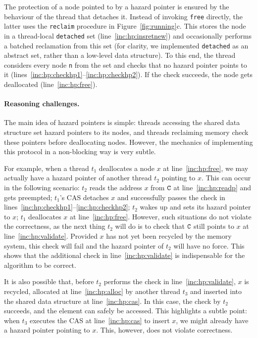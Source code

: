 The protection of a node pointed to by a hazard pointer is ensured by the
behaviour of the thread that detaches it. Instead of invoking {\tt free}
directly, the latter uses the \texttt{reclaim} procedure in
Figure~\ref{fig:running}c. This stores the node in a thread-local {\tt detached}
set (line~\ref{inc:hp:insretnew}) and occasionally performs a batched
reclamation from this set (for clarity, we implemented {\tt detached} as an
abstract set, rather than a low-level data structure). To this end,
the thread considers every node {\tt n} from the set and checks that no hazard
pointer points to it (lines~\ref{inc:hp:checkhp1}--\ref{inc:hp:checkhp2}).  If
the check succeeds, the node gets deallocated (line~\ref{inc:hp:free}).


\paragraph{Reasoning challenges.}
The main idea of hazard pointers is simple: threads accessing the shared data
structure set hazard pointers to its nodes, and threads reclaiming memory check
these pointers before deallocating nodes. However, the mechanics of implementing
this protocol in a non-blocking way is very subtle. 

For example, when a thread $t_1$ deallocates a node $x$ at
line~\ref{inc:hp:free}, we may actually have a hazard pointer of another thread
$t_2$ pointing to $x$. This can occur in the following scenario: $t_2$ reads the
address $x$ from $\texttt{C}$ at line~\ref{inc:hp:readp} and gets preempted; $t_1$'s CAS
detaches $x$ and successfully passes the check in
lines~\ref{inc:hp:checkhp1}--\ref{inc:hp:checkhp2}; $t_2$ wakes up and sets its
hazard pointer to $x$; $t_1$ deallocates $x$ at line~\ref{inc:hp:free}. However,
such situations do not violate the correctness, as the next thing $t_2$ will do
is to check that $\texttt{C}$ still points to $x$ at line~\ref{inc:hp:validate}.  Provided
$x$ has not yet been recycled by the memory system, this check will fail and the
hazard pointer of $t_2$ will have no force. This shows that the additional check
in line~\ref{inc:hp:validate} is indispensable for the algorithm to be correct.

It is also possible that, before $t_2$ performs the check in
line~\ref{inc:hp:validate}, $x$ is recycled, allocated at
line~\ref{inc:hp:alloc} by another thread $t_3$ and inserted into the shared
data structure at line~\ref{inc:hp:cas}. In this case, the check by $t_2$
succeeds, and the element can safely be accessed. This highlights
a subtle point: when $t_3$ executes the CAS at
line~\ref{inc:hp:cas} to insert $x$, we might already have a hazard pointer
pointing to $x$. This, however, does not violate correctness.

